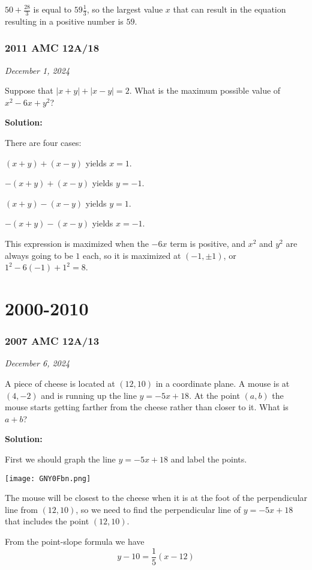 \documentclass[../mathproblems.tex]{subfiles}
\begin{document}
$50+\frac{28}{3}$ is equal to $59\frac{1}{3}$, so the largest value $x$ that can result in the equation resulting in a positive number is $\boxed{59}$.

\noindent\hrulefill
\subsubsection*{2011 AMC 12A/18} 
\textit{December 1, 2024}

Suppose that $\left|x+y\right|+\left|x-y\right|=2$. What is the maximum possible value of $x^2-6x+y^2$?

\textbf{Solution:}

There are four cases:

$(x+y)+(x-y)$ yields $x=1$.

$-(x+y)+(x-y)$ yields $y=-1$.

$(x+y)-(x-y)$ yields $y=1$.

$-(x+y)-(x-y)$ yields $x=-1$.

This expression is maximized when the $-6x$ term is positive, and $x^2$ and $y^2$ are always going to be $1$ each, so it is maximized at $(-1,\pm 1)$, or $1^2-6(-1)+1^2=\boxed{8}$.

\noindent\hrulefill
\section{2000-2010}
\subsubsection*{2007 AMC 12A/13}
\textit{December 6, 2024}

A piece of cheese is located at $(12,10)$ in a coordinate plane. A mouse is at $(4,-2)$ and is running up the line $y=-5x+18$. At the point $(a,b)$ the mouse starts getting farther from the cheese rather than closer to it. What is $a+b$? 

\textbf{Solution:}

First we should graph the line $y=-5x+18$ and label the points.
\begin{center}
    \texttt{[image: GNY0Fbn.png]}
\end{center}

The mouse will be closest to the cheese when it is at the foot of the perpendicular line from $(12,10)$, so we need to find the perpendicular line of $y=-5x+18$ that includes the point $(12,10)$.

From the point-slope formula we have 
\[ y-10 = \frac{1}{5}(x-12) \]
\end{document}
